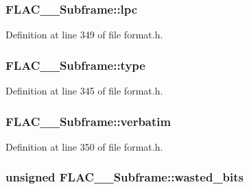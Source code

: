 \subsubsection[{\texorpdfstring{lpc}{lpc}}]{ F\+L\+A\+C\+\_\+\+\_\+\+Subframe\+::lpc}\hypertarget{struct_f_l_a_c_____subframe_a298cb7680a387b1b95815cd51648f400}{}\label{struct_f_l_a_c_____subframe_a298cb7680a387b1b95815cd51648f400}


Definition at line 349 of file format.\+h.

\subsubsection[{\texorpdfstring{type}{type}}]{ F\+L\+A\+C\+\_\+\+\_\+\+Subframe\+::type}\hypertarget{struct_f_l_a_c_____subframe_a1de133ee69f416636e24a990d4bd6b44}{}\label{struct_f_l_a_c_____subframe_a1de133ee69f416636e24a990d4bd6b44}


Definition at line 345 of file format.\+h.

\subsubsection[{\texorpdfstring{verbatim}{verbatim}}]{ F\+L\+A\+C\+\_\+\+\_\+\+Subframe\+::verbatim}\hypertarget{struct_f_l_a_c_____subframe_ae7b7d3263298a9326f3ac3e9d56b2a6c}{}\label{struct_f_l_a_c_____subframe_ae7b7d3263298a9326f3ac3e9d56b2a6c}


Definition at line 350 of file format.\+h.

\subsubsection[{\texorpdfstring{wasted\+\_\+bits}{wasted_bits}}]{\setlength{\rightskip}{0pt plus 5cm}unsigned F\+L\+A\+C\+\_\+\+\_\+\+Subframe\+::wasted\+\_\+bits}\hypertarget{struct_f_l_a_c_____subframe_a96a6848ded4e90e26d54f0dd7066c306}{}\label{struct_f_l_a_c_____subframe_a96a6848ded4e90e26d54f0dd7066c306}


